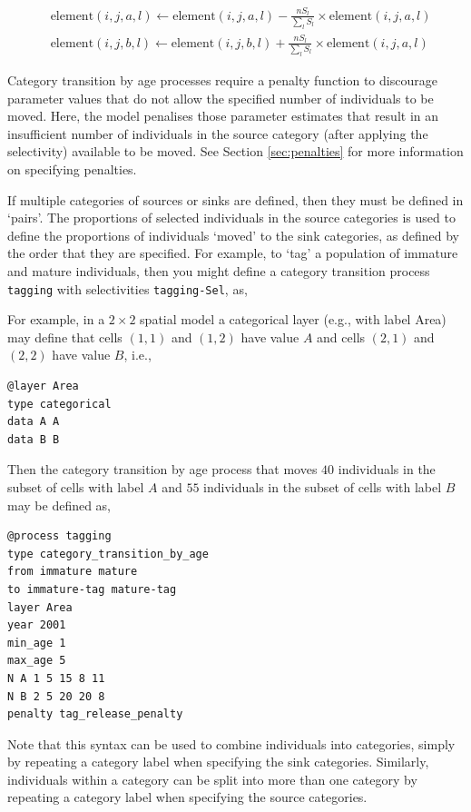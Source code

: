 \begin{equation}\begin{split}
  & \text{element}(i,j,a,l) \leftarrow \text{element}(i,j,a,l) - \frac{nS_l}{\sum\limits_l S_l} \times \text{element}(i,j,a,l) \\
  & \text{element}(i,j,b,l) \leftarrow \text{element}(i,j,b,l) + \frac{nS_l}{\sum\limits_l S_l} \times \text{element}(i,j,a,l)
\end{split}\end{equation}

Category transition by age processes require a penalty function to discourage parameter values that do not allow the specified number of individuals to be moved. Here, the model penalises those parameter estimates that result in an insufficient number of individuals in the source category (after applying the selectivity) available to be moved. See Section \ref{sec:penalties} for more information on specifying penalties.

If multiple categories of sources or sinks are defined, then they must be defined in `pairs'. The proportions of selected individuals in the source categories is used to define the proportions of individuals `moved' to the sink categories, as defined by the order that they are specified. For example, to `tag' a population of immature and mature individuals, then you might define a category transition process \texttt{tagging} with selectivities \texttt{tagging-Sel}, as,

For example, in a $2 \times 2$ spatial model a categorical layer (e.g., with label Area) may define that cells $(1,1)$ and $(1,2)$ have value $A$ and cells $(2,1)$ and $(2,2)$ have value $B$, i.e.,
{\small{\begin{verbatim}
@layer Area
type categorical
data A A 
data B B
\end{verbatim}}}

Then the category transition by age process that moves $40$ individuals in the subset of cells with label $A$ and $55$ individuals in the subset of cells with label $B$ may be defined as, 
{\small{\begin{verbatim}
@process tagging
type category_transition_by_age
from immature mature
to immature-tag mature-tag
layer Area
year 2001
min_age 1
max_age 5
N A 1 5 15 8 11
N B 2 5 20 20 8
penalty tag_release_penalty
\end{verbatim}}}

Note that this syntax can be used to combine individuals into categories, simply by repeating a category label when specifying the sink categories. Similarly, individuals within a category can be split into more than one category by repeating a category label when specifying the source categories.

